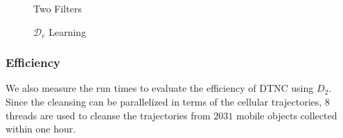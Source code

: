 \documentclass{vldb}
\begin{document}
	\begin{figure*}[!htbp]
		\begin{minipage}[b]{0.5\textwidth}
			\centering
			\vspace{-10pt}
			\caption{Two Filters}
			\label{fig:two-f}
		\end{minipage}
		\hfill
		\begin{minipage}[b]{0.5\textwidth}
			\centering
			\vspace{-10pt}
			\caption{$\mathcal{D}_e$ Learning}
			\label{fig:de-learn}
		\end{minipage}
	\end{figure*}
	
	
	\subsubsection{Efficiency}
	
	We also measure the run times to evaluate the efficiency of DTNC using $D_2$.%
	Since the cleansing can be parallelized in terms of the cellular trajectories, $8$ threads are used to cleanse the trajectories from $2031$ mobile objects collected within one hour. 
	
\end{document}
